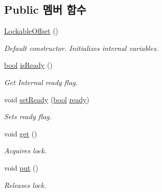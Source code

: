 \subsection*{Public 멤버 함수}
\begin{DoxyCompactItemize}
\item 
\hyperlink{class_lockable_offset_a3fd4ada02667f15fde646fa8b32aaf1d}{Lockable\+Offset} ()
\begin{DoxyCompactList}\small\item\em Default constructor. Initializes internal variables. \end{DoxyCompactList}\item 
\hyperlink{avb__gptp_8h_af6a258d8f3ee5206d682d799316314b1}{bool} \hyperlink{class_lockable_offset_acbed040576a7a18e2d9c46b2f15e0162}{is\+Ready} ()
\begin{DoxyCompactList}\small\item\em Get Internal ready flag. \end{DoxyCompactList}\item 
void \hyperlink{class_lockable_offset_afc31074bae05a5b224593091da17e149}{set\+Ready} (\hyperlink{avb__gptp_8h_af6a258d8f3ee5206d682d799316314b1}{bool} \hyperlink{class_lockable_offset_a65cf7d7f8e531611b245355ab91fd749}{ready})
\begin{DoxyCompactList}\small\item\em Sets ready flag. \end{DoxyCompactList}\item 
void \hyperlink{class_lockable_a5a8046fd4b22dbe2b30ef4d18c5ac64e}{get} ()
\begin{DoxyCompactList}\small\item\em Acquires lock. \end{DoxyCompactList}\item 
void \hyperlink{class_lockable_a760567729cc565fd13d414937a558a89}{put} ()
\begin{DoxyCompactList}\small\item\em Releases lock. \end{DoxyCompactList}\end{DoxyCompactItemize}
